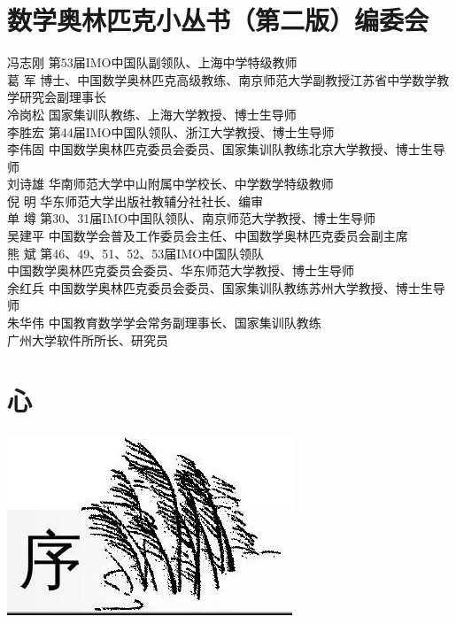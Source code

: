 \documentclass[10pt]{article}
\begin{document}
\section*{数学奥林匹克小丛书（第二版）编委会}
冯志刚 第53届IMO中国队副领队、上海中学特级教师\\
葛 军 博士、中国数学奥林匹克高级教练、南京师范大学副教授江苏省中学数学教学研究会副理事长\\
冷岗松 国家集训队教练、上海大学教授、博士生导师\\
李胜宏 第44届IMO中国队领队、浙江大学教授、博士生导师\\
李伟固 中国数学奥林匹克委员会委员、国家集训队教练北京大学教授、博士生导师\\
刘诗雄 华南师范大学中山附属中学校长、中学数学特级教师\\
倪 明 华东师范大学出版社教辅分社社长、编审\\
单 墫 第30、31届IMO中国队领队、南京师范大学教授、博士生导师\\
吴建平 中国数学会普及工作委员会主任、中国数学奥林匹克委员会副主席\\
熊 斌 第46、49、51、52、53届IMO中国队领队\\
中国数学奥林匹克委员会委员、华东师范大学教授、博士生导师\\
余红兵 中国数学奥林匹克委员会委员、国家集训队教练苏州大学教授、博士生导师\\
朱华伟 中国教育数学学会常务副理事长、国家集训队教练\\
广州大学软件所所长、研究员

\section*{心}
\begin{center}
\includegraphics[max width=\textwidth]{2024_10_30_66b8e5e701da2093c133g-006}
\end{center}
\end{document}
